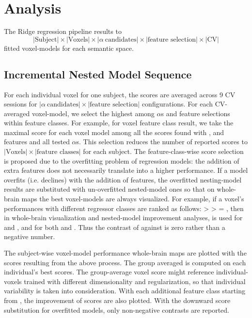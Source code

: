 \section{Analysis}

The Ridge regression pipeline results to \[ \lvert \text{Subject} \rvert \times \lvert \text{Voxels} \rvert \times \lvert \alpha~\text{candidates} \rvert \times \lvert \text{feature selection} \rvert \times \lvert \text{CV} \rvert \] fitted voxel-models for each semantic space. 


\subsection{Incremental Nested Model Sequence}

For each individual voxel for one subject, the  scores are averaged across 9 CV sessions for \( \lvert \alpha~\text{candidates} \rvert \times \lvert \text{feature selection} \rvert \) configurations. For each CV-averaged voxel-model, we select the highest  among \(\alpha\)s and feature selections within feature classes. For example, for voxel   feature class result, we take the maximal  score for each voxel  model among all the scores found with ,  and  features and all tested \(\alpha\)s. This selection reduces the number of reported scores to \( \lvert \text{Voxels} \rvert \times \lvert \text{feature classes} \rvert \) for each subject. The feature-class-wise score selection is proposed due to the overfitting problem of regression models: the addition of extra features does not necessarily translate into a higher performance. If a model overfits (i.e.  declines) with the addition of features, the overfitted nesting-model results are substituted with un-overfitted nested-model ones so that on whole-brain maps the best voxel-models are always visualized. For example, if a voxel's  performances with different regressor classes are ranked as follows:  >  >  = , then in whole-brain visualization and nested-model improvement analyses,   is used for  and , and   for both  and . Thus the contrast of  against  is zero rather than a negative number.

The subject-wise voxel-model performance whole-brain maps are plotted with the scores resulting from the above process. The group averaged is computed on each individual's best scores. The group-average voxel score might reference individual-voxels trained with different dimensionality and regularization, so that individual variability is taken into consideration. With each additional feature class starting from , the improvement of  scores are also plotted. With the downward score substitution for overfitted models, only non-negative contrasts are reported. 
 

